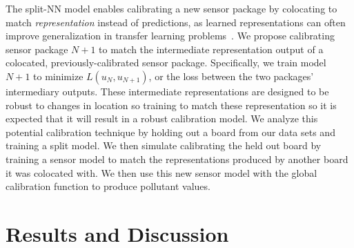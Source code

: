 \documentclass[journal abbreviation, manuscript]{copernicus}
\begin{document}
The split-NN model enables calibrating a new sensor package by colocating to match \textit{representation} instead of predictions, as learned representations can often improve generalization in transfer learning problems~\citep{Goodfellow-et-al-2016}.  We propose calibrating sensor package $N+1$ to match the intermediate representation output of a colocated, previously-calibrated sensor package. Specifically, we train model $N + 1$ to minimize $L(u_N, u_{N + 1})$, or the loss between the two packages' intermediary outputs. These intermediate representations are designed to be robust to changes in location so training to match these representation so it is expected that it will result in a robust calibration model. We analyze this potential calibration technique by holding out a board from our data sets and training a split model. We then simulate calibrating the held out board by training a sensor model to match the representations produced by another board it was colocated with. We then use this new sensor model with the global calibration function to produce pollutant values. 


\section{Results and Discussion}
\end{document}
